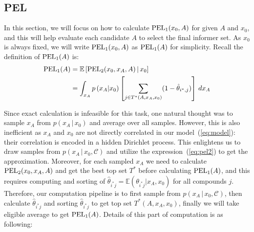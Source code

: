 \documentclass[12pt]{article}
\begin{document}
\subsection{PEL}
In this section, we will focus on how to calculate ${\rm PEL}_1(x_0,A)$ for given $A$ and $x_0$, and this will help evaluate each candidate $A$ to select the final informer set. As $x_0$ is always fixed, we will write ${\rm PEL}_1(x_0,A)$ as ${\rm PEL}_1(A)$ for simplicity. Recall the definition of ${\rm PEL}_1(A)$ is:
\begin{align*}
{\mbox {\rm PEL}}_1(A) &= \mathbb E\left[ {\mbox {\rm PEL}}_2(x_0,x_A,A) \, |\, x_0\right]\\
&= \int_{x_{ A}} p\left( x_{A} | x_0 \right)
\left[ \sum_{j \in  T^*(A,x_A,x_0)} ( 1 - \hat \theta_{i^*,j} ) \right] \, dx_{ A}
\end{align*}

Since exact calculation is infeasible for this task, one natural thought was to sample $x_A$ from $p(x_A\,|\,x_0)$ and average over all samples. However, this is also inefficient as $x_A$ and $x_0$ are not directly correlated in our model~(\ref{eq:model}): their correlation is encoded in a hidden Dirichlet process. This enlightens us to draw samples from $p(x_A\,|\, x_0,\mathcal{C})$ and utilize the expression~(\ref{eq:pel2}) to get the approximation. Moreover, for each sampled $x_A$ we need to calculate ${\rm PEL}_2(x_0,x_A,A)$ and get the best top set $T^*$ before calculating ${\rm PEL}_1(A)$, and this requires computing and sorting of $\hat \theta_{i^*j} = \mathbb{E}\left( \theta_{i^*j} |x_A, x_0 \right)$ for all compounds $j$. Therefore, our computation pipeline is to first sample from $p(x_A\,|\,x_0,\mathcal{C})$, then calculate $\hat \theta_{i^*j}$ and sorting $\hat \theta_{i^*j}$ to get top set $T^*(A,x_A,x_0)$, finally we will take eligible average to get ${\rm PEL}_1(A)$. Details of this part of computation is as following:
\end{document}
